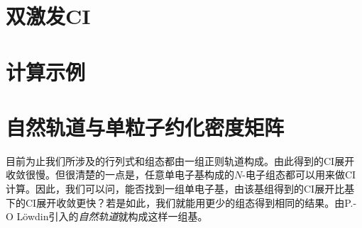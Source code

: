 \section{双激发CI}\mbox{}
\section{计算示例}\mbox{}
\section{自然轨道与单粒子约化密度矩阵}
目前为止我们所涉及的行列式和组态都由一组正则\hft 轨道构成。由此得到的CI展开收敛很慢。但很清楚的一点是，任意单电子基构成的$N$-电子组态都可以用来做CI计算。因此，我们可以问，能否找到一组单电子基，由该基组得到的CI展开比\hft 基下的CI展开收敛更快？若是如此，我们就能用更少的组态得到相同的结果。由P.-O L\"owdin引入的\emph{自然轨道}就构成这样一组基。

